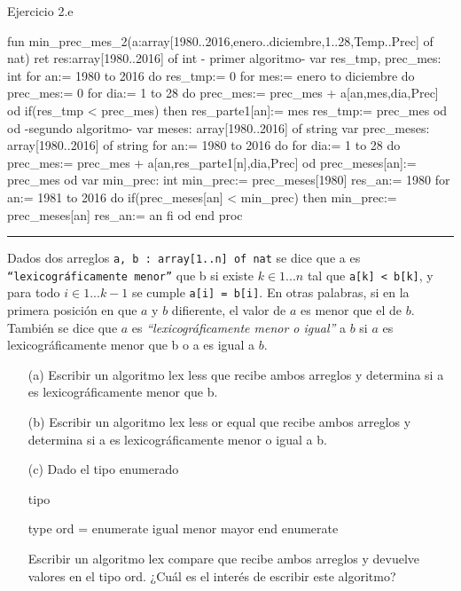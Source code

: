 \begin{codebox}{Ejercicio 2.e}
\begin{pascallike}
fun min_prec_mes_2(a:array[1980..2016,enero..diciembre,1..28,Temp..Prec] of nat) 
        ret res:array[1980..2016] of int
    {- primer algoritmo-}
    var res_tmp, prec_mes: int
    for an:= 1980 to 2016 do
        res_tmp:= 0
        for mes:= enero to diciembre do
            prec_mes:= 0
            for dia:= 1 to 28 do
            prec_mes:= prec_mes + a[an,mes,dia,Prec]
            od
            if(res_tmp < prec_mes) then
            res_parte1[an]:= mes
            res_tmp:= prec_mes
        od
    od
    {-segundo algoritmo-}
    var meses: array[1980..2016] of string
    var prec_meses: array[1980..2016] of string
    for an:= 1980 to 2016 do
        for dia:= 1 to 28 do
            prec_mes:= prec_mes + a[an,res_parte1[n],dia,Prec]
        od
        prec_meses[an]:= prec_mes
    od
    var min_prec: int
    min_prec:= prec_meses[1980]
    res_an:= 1980
    for an:= 1981 to 2016 do
        if(prec_meses[an] < min_prec) then
            min_prec:= prec_meses[an]
            res_an:= an
        fi
    od
end proc
\end{pascallike}
\end{codebox}

\begin{center}
    \rule{\textwidth}{0.4pt}
\end{center}

Dados dos arreglos \texttt{a, b : array[1..n] of nat} se dice que a es \texttt{“lexicográficamente menor”} que b si existe $k \in {1 . . . n}$ tal que \texttt{a[k] < b[k]}, y para todo $i \in {1 . . . k - 1}$ se cumple \texttt{a[i] = b[i]}. En otras palabras, si en la primera posición en que $a$ y $b$ difierente, el valor de $a$ es menor que el de $b$. También se dice que $a$ es \textit{“lexicográficamente menor o igual”} a $b$ si $a$ es lexicográficamente menor que b o a es igual a $b$.

\begin{itemize}
    \item[(a)] Escribir un algoritmo lex less que recibe ambos arreglos y determina si a es lexicográficamente menor que b.
    \item[(b)] Escribir un algoritmo lex less or equal que recibe ambos arreglos y determina si a es lexicográficamente menor o igual a b. 
    \item[(c)] Dado el tipo enumerado
\begin{codebox}{tipo}
\begin{pascallike}
type ord = enumerate
             igual
             menor
             mayor
           end enumerate
\end{pascallike}
\end{codebox}
Escribir un algoritmo lex compare que recibe ambos arreglos y devuelve valores en el tipo ord. ¿Cuál es el interés de escribir este algoritmo?
\end{itemize}

